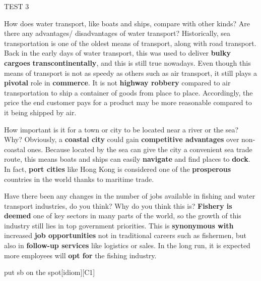 \begin{glossarymc}[Cambridge 4]
\begin{test}{TEST 3}
	\begin{qa}{How does water transport, like boats and ships, compare with other kinds? Are there any advantages/ disadvantages of water transport?}
	Historically, sea transportation is one of the oldest means of transport, along with road transport. Back in the early days of water transport, this was used to deliver \textbf{bulky cargoes} \textbf{transcontinentally}, and this is still true nowadays. Even though this means of transport is not as speedy as others such as air transport, it still plays a \textbf{pivotal} role in \textbf{commerce}. It is not \textbf{highway robbery} compared to air transportation to ship a container of goods from place to place. Accordingly, the price the end customer pays for a product may be more reasonable compared to it being shipped by air.
	\end{qa}

	\begin{qa}{How important is it for a town or city to be located near a river or the sea? Why?}
	Obviously, a \textbf{coastal city} could gain \textbf{competitive advantages} over non-coastal ones. Because located by the sea can give the city a convenient sea trade route, this means boats and ships can easily \textbf{navigate} and find places to \textbf{dock}. In fact, \textbf{port cities} like Hong Kong is considered one of the \textbf{prosperous} countries in the world thanks to maritime trade.
	\end{qa}

	\begin{qa}{Have there been any changes in the number of jobs available in fishing and water transport industries, do you think? Why do you think this is?}
	\textbf{Fishery is deemed} one of key sectors in many parts of the world, so the growth of this industry still lies in top government priorities. This is \textbf{synonymous with} increased \textbf{job opportunities} not in traditional careers such as fishermen, but also in \textbf{follow-up services} like logistics or sales. In the long run, it is expected more employees will \textbf{opt for} the fishing industry.
	\end{qa}

        \begin{VocabExplain}[Part 3]
			\begin{ExplainCard}{put sb on the spot}[idiom][C1]
			\end{ExplainCard}


\end{VocabExplain}
\end{test}
\end{glossarymc}
